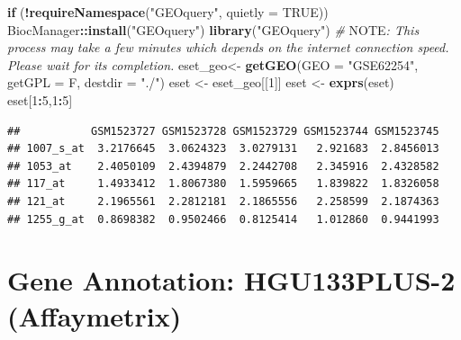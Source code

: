 \documentclass[
  12pt,
]{book}
\newenvironment{Shaded}{\begin{snugshade}}{\end{snugshade}}
\newcommand{\AlertTok}[1]{\textcolor[rgb]{0.94,0.16,0.16}{#1}}
\newcommand{\AttributeTok}[1]{\textcolor[rgb]{0.13,0.29,0.53}{#1}}
\newcommand{\CommentTok}[1]{\textcolor[rgb]{0.56,0.35,0.01}{\textit{#1}}}
\newcommand{\ConstantTok}[1]{\textcolor[rgb]{0.56,0.35,0.01}{#1}}
\newcommand{\ControlFlowTok}[1]{\textcolor[rgb]{0.13,0.29,0.53}{\textbf{#1}}}
\newcommand{\DecValTok}[1]{\textcolor[rgb]{0.00,0.00,0.81}{#1}}
\newcommand{\FunctionTok}[1]{\textcolor[rgb]{0.13,0.29,0.53}{\textbf{#1}}}
\newcommand{\NormalTok}[1]{#1}
\newcommand{\OtherTok}[1]{\textcolor[rgb]{0.56,0.35,0.01}{#1}}
\newcommand{\SpecialCharTok}[1]{\textcolor[rgb]{0.81,0.36,0.00}{\textbf{#1}}}
\newcommand{\StringTok}[1]{\textcolor[rgb]{0.31,0.60,0.02}{#1}}
\begin{document}
\begin{Shaded}
\begin{Highlighting}[]
\ControlFlowTok{if}\NormalTok{ (}\SpecialCharTok{!}\FunctionTok{requireNamespace}\NormalTok{(}\StringTok{"GEOquery"}\NormalTok{, }\AttributeTok{quietly =} \ConstantTok{TRUE}\NormalTok{))  BiocManager}\SpecialCharTok{::}\FunctionTok{install}\NormalTok{(}\StringTok{"GEOquery"}\NormalTok{)}
\FunctionTok{library}\NormalTok{(}\StringTok{"GEOquery"}\NormalTok{)}
\CommentTok{\# }\AlertTok{NOTE}\CommentTok{: This process may take a few minutes which depends on the internet connection speed. Please wait for its completion.}
\NormalTok{eset\_geo}\OtherTok{\textless{}{-}} \FunctionTok{getGEO}\NormalTok{(}\AttributeTok{GEO     =} \StringTok{"GSE62254"}\NormalTok{, }\AttributeTok{getGPL  =}\NormalTok{ F, }\AttributeTok{destdir =} \StringTok{"./"}\NormalTok{)}
\NormalTok{eset    }\OtherTok{\textless{}{-}}\NormalTok{ eset\_geo[[}\DecValTok{1}\NormalTok{]]}
\NormalTok{eset    }\OtherTok{\textless{}{-}} \FunctionTok{exprs}\NormalTok{(eset)}
\NormalTok{eset[}\DecValTok{1}\SpecialCharTok{:}\DecValTok{5}\NormalTok{,}\DecValTok{1}\SpecialCharTok{:}\DecValTok{5}\NormalTok{]}
\end{Highlighting}
\end{Shaded}

\begin{verbatim}
##           GSM1523727 GSM1523728 GSM1523729 GSM1523744 GSM1523745
## 1007_s_at  3.2176645  3.0624323  3.0279131   2.921683  2.8456013
## 1053_at    2.4050109  2.4394879  2.2442708   2.345916  2.4328582
## 117_at     1.4933412  1.8067380  1.5959665   1.839822  1.8326058
## 121_at     2.1965561  2.2812181  2.1865556   2.258599  2.1874363
## 1255_g_at  0.8698382  0.9502466  0.8125414   1.012860  0.9441993
\end{verbatim}

\hypertarget{gene-annotation-hgu133plus-2-affaymetrix}{%
\section{Gene Annotation: HGU133PLUS-2 (Affaymetrix)}\label{gene-annotation-hgu133plus-2-affaymetrix}}
\end{document}
